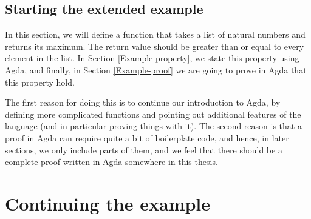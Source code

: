 \subsection{Starting the extended example}
\label{Example-start}
In this section, we will define a function that takes a list of natural numbers and returns its maximum. The return value should be greater than or equal to every element in the list. In Section \ref{Example-property}, we state this property using Agda, and finally, in Section \ref{Example-proof} we are going to prove in Agda that this property hold.

The first reason for doing this is to continue our introduction to Agda, by defining more complicated functions and pointing out additional features of the language (and in particular proving things with it). The second reason is that a proof in Agda can require quite a bit of boilerplate code, and hence, in later sections, we only include parts of them, and we feel that there should be a complete proof written in Agda somewhere in this thesis.


\section{Continuing the example}
